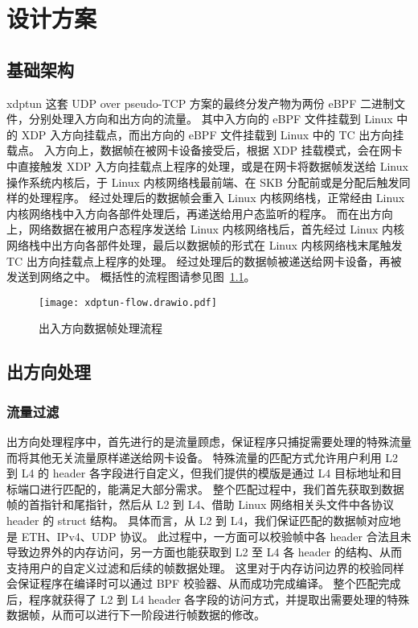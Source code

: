 

\chapter{设计方案}

\section{基础架构}

xdptun 这套 UDP over pseudo-TCP 方案的最终分发产物为两份 eBPF 二进制文件，分别处理入方向和出方向的流量。
其中入方向的 eBPF 文件挂载到 Linux 中的 XDP 入方向挂载点，而出方向的 eBPF 文件挂载到 Linux 中的 TC 出方向挂载点。
入方向上，数据帧在被网卡设备接受后，根据 XDP 挂载模式，会在网卡中直接触发 XDP 入方向挂载点上程序的处理，或是在网卡将数据帧发送给 Linux 操作系统内核后，于 Linux 内核网络栈最前端、在 SKB 分配前或是分配后触发同样的处理程序。
经过处理后的数据帧会重入 Linux 内核网络栈，正常经由 Linux 内核网络栈中入方向各部件处理后，再递送给用户态监听的程序。
而在出方向上，网络数据在被用户态程序发送给 Linux 内核网络栈后，首先经过 Linux 内核网络栈中出方向各部件处理，最后以数据帧的形式在 Linux 内核网络栈末尾触发 TC 出方向挂载点上程序的处理。
经过处理后的数据帧被递送给网卡设备，再被发送到网络之中。
概括性的流程图请参见图~\ref{fig:flow}。

\begin{figure}[h]
  \centering
  \texttt{[image: xdptun-flow.drawio.pdf]}
  \caption{出入方向数据帧处理流程}
  \label{fig:flow}
\end{figure}

\section{出方向处理}

\subsection{流量过滤}

出方向处理程序中，首先进行的是流量顾虑，保证程序只捕捉需要处理的特殊流量而将其他无关流量原样递送给网卡设备。
特殊流量的匹配方式允许用户利用 L2 到 L4 的 header 各字段进行自定义，但我们提供的模版是通过 L4 目标地址和目标端口进行匹配的，能满足大部分需求。
整个匹配过程中，我们首先获取到数据帧的首指针和尾指针，然后从 L2 到 L4、借助 Linux 网络相关头文件中各协议 header 的 struct 结构。
具体而言，从 L2 到 L4，我们保证匹配的数据帧对应地是 ETH、IPv4、UDP 协议。
此过程中，一方面可以校验帧中各 header 合法且未导致边界外的内存访问，另一方面也能获取到 L2 至 L4 各 header 的结构、从而支持用户的自定义过滤和后续的帧数据处理。
这里对于内存访问边界的校验同样会保证程序在编译时可以通过 BPF 校验器、从而成功完成编译。
整个匹配完成后，程序就获得了 L2 到 L4 header 各字段的访问方式，并提取出需要处理的特殊数据帧，从而可以进行下一阶段进行帧数据的修改。

